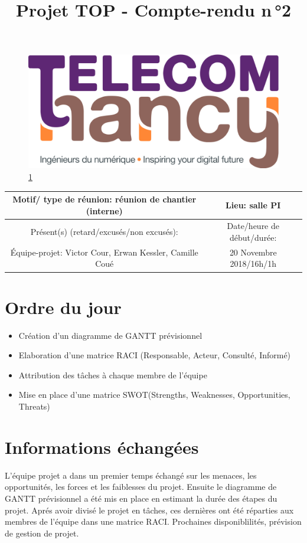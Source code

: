\documentclass{article}
\date{}
\begin{document}
\begin{figure}
    \centering
    \includegraphics[scale=0.05]{logo_TNCY.png}
    \label{fig:logo_tncy}
    \ref{fig:logo_tncy}
\end{figure}
\title{Projet TOP - Compte-rendu n\,°2}
\maketitle
\vspace*{-1cm}


\begin{tabular}{|c|c|}
  \hline
  Motif/ type de réunion: réunion de chantier (interne) & Lieu: salle PI  \\
  \hline
   Présent(s) (retard/excusés/non excusés): &  Date/heure de début/durée:\\
  Équipe-projet: Victor Cour,
                  Erwan Kessler,
                  Camille Coué
 & 20 Novembre 2018/16h/1h \\
  \hline
 \end{tabular}

\section{Ordre du jour}
\begin{itemize}
  \item Création d'un diagramme de GANTT prévisionnel
  \item Elaboration d'une matrice RACI (Responsable, Acteur, Consulté, Informé)
  \item Attribution des tâches à chaque membre de l'équipe
  \item Mise en place d'une matrice SWOT(Strengths, Weaknesses, Opportunities, Threats)
\end{itemize}


\section{Informations échangées}
L'équipe projet a dans un premier temps échangé sur les menaces, les opportunités, les forces et les faiblesses du projet. Ensuite le diagramme de GANTT prévisionnel a été mis en place en estimant la durée des étapes du projet. 
Aprés avoir divisé le projet en tâches, ces dernières ont été réparties aux membres de l'équipe dans une matrice RACI.
Prochaines disponiblilités, prévision de gestion de projet.
\end{document}
